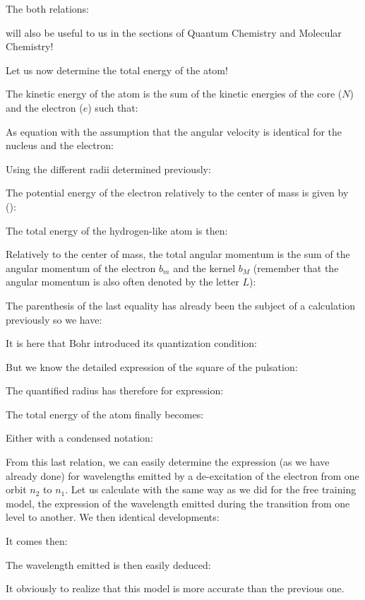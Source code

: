 	The both relations:
	
	will also be useful to us in the sections of Quantum Chemistry and Molecular Chemistry!
	
	Let us now determine the total energy of the atom!

	The kinetic energy of the atom is the sum of the kinetic energies of the core ($N$) and the electron ($e$) such that:
	
As equation with the assumption that the angular velocity is identical for the nucleus and the electron:
	
Using the different radii determined previously:
	
The potential energy of the electron relatively to the center of mass is given by ():
	
The total energy of the hydrogen-like atom is then:
	

Relatively to the center of mass, the total angular momentum is the sum of the angular momentum of the electron $b_m$ and the kernel $b_M$ (remember that the angular momentum is also often denoted by the letter $L$):
	
The parenthesis of the last equality has already been the subject of a calculation previously so we have:
	
It is here that Bohr introduced its quantization condition:
	
	But we know the detailed expression of the square of the pulsation:
	
	The  quantified radius has therefore for expression:
		
	The total energy of the atom finally becomes:
		
		Either with a condensed notation:
		
From this last relation, we can easily determine the expression (as we have already done) for wavelengths emitted by a de-excitation of the electron from one orbit $n_2$ to $n_1$. Let us calculate with the same way as we did for the free training model, the expression of the wavelength emitted during the transition from one level to another. We then identical developments:
		
It comes then:
		
The wavelength emitted is then easily deduced:
		

	\begin{tcolorbox}[title=Remark,colframe=black,arc=10pt]
It obviously to realize that this model is more accurate than the previous one.
	\end{tcolorbox}	
	
